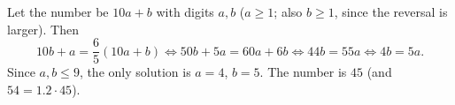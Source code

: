 Let the number be $10a+b$ with digits $a,b$ ($a\ge1$; also $b\ge1$, since the reversal is larger). Then
\[10b+a=\dfrac65(10a+b)\iff50b+5a=60a+6b\iff44b=55a\iff4b=5a.\]
Since $a,b\le9$, the only solution is $a=4$, $b=5$. The number is $\boxed{45}$ (and $54=1.2\cdot45$).
